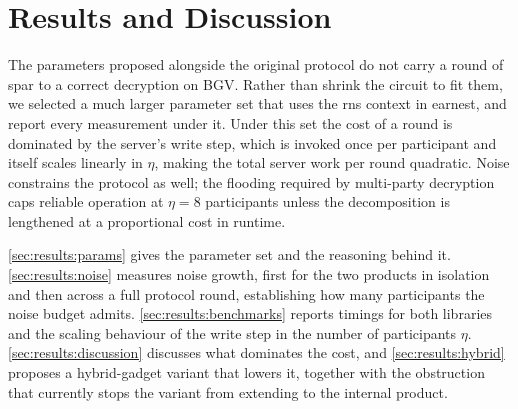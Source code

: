 


\chapter{Results and Discussion}
\label{chp:results}

\vfill
The parameters proposed alongside the original protocol do not carry a round of \gls{spar} to a correct decryption on BGV. Rather than shrink the circuit to fit them, we selected a much larger parameter set that uses the \gls{rns} context in earnest, and report every measurement under it. Under this set the cost of a round is dominated by the server's write step, which is invoked once per participant and itself scales linearly in $\eta$, making the total server work per round quadratic. Noise constrains the protocol as well; the flooding required by multi-party decryption caps reliable operation at $\eta = 8$ participants unless the decomposition is lengthened at a proportional cost in runtime.

\autoref{sec:results:params} gives the parameter set and the reasoning behind it. \autoref{sec:results:noise} measures noise growth, first for the two products in isolation and then across a full protocol round, establishing how many participants the noise budget admits. \autoref{sec:results:benchmarks} reports timings for both libraries and the scaling behaviour of the write step in the number of participants $\eta$. \autoref{sec:results:discussion} discusses what dominates the cost, and \autoref{sec:results:hybrid} proposes a hybrid-gadget variant that lowers it, together with the obstruction that currently stops the variant from extending to the internal product.
\newpage


\newpage



\newpage




